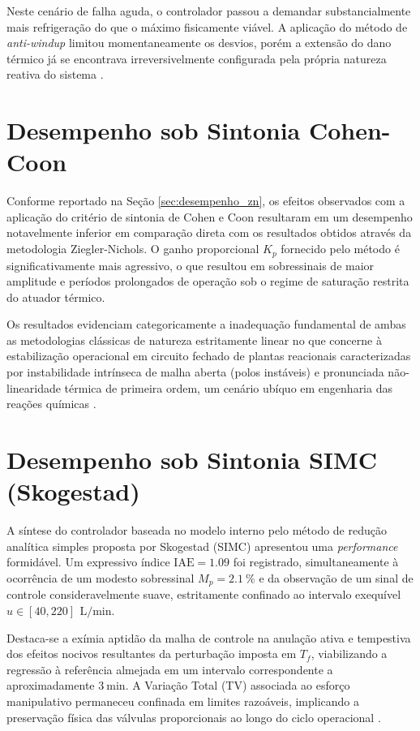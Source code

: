 Neste cenário de falha aguda, o controlador passou a demandar substancialmente mais refrigeração do que o máximo fisicamente viável. A aplicação do método de \textit{anti-windup} limitou momentaneamente os desvios, porém a extensão do dano térmico já se encontrava irreversivelmente configurada pela própria natureza reativa do sistema \cite{Bequette2003}.

\section{Desempenho sob Sintonia Cohen-Coon}
\label{sec:desempenho_cc}

Conforme reportado na Seção \ref{sec:desempenho_zn}, os efeitos observados com a aplicação do critério de sintonia de Cohen e Coon \cite{CohenCoon1953} resultaram em um desempenho notavelmente inferior em comparação direta com os resultados obtidos através da metodologia Ziegler-Nichols. O ganho proporcional $K_p$ fornecido pelo método é significativamente mais agressivo, o que resultou em sobressinais de maior amplitude e períodos prolongados de operação sob o regime de saturação restrita do atuador térmico.

Os resultados evidenciam categoricamente a inadequação fundamental de ambas as metodologias clássicas de natureza estritamente linear no que concerne à estabilização operacional em circuito fechado de plantas reacionais caracterizadas por instabilidade intrínseca de malha aberta (polos instáveis) e pronunciada não-linearidade térmica de primeira ordem, um cenário ubíquo em engenharia das reações químicas \cite{Luyben2007}.

\section{Desempenho sob Sintonia SIMC (Skogestad)}
\label{sec:desempenho_simc}

A síntese do controlador baseada no modelo interno pelo método de redução analítica simples proposta por Skogestad (SIMC) \cite{Skogestad2003} apresentou uma \textit{performance} formidável. Um expressivo índice $\text{IAE} = 1.09$ foi registrado, simultaneamente à ocorrência de um modesto sobressinal $M_p = \SI{2.1}{\percent}$ e da observação de um sinal de controle consideravelmente suave, estritamente confinado ao intervalo exequível $u \in [40, 220]\,\SI{}{\liter\per\minute}$.

Destaca-se a exímia aptidão da malha de controle na anulação ativa e tempestiva dos efeitos nocivos resultantes da perturbação imposta em $T_f$, viabilizando a regressão à referência almejada em um intervalo correspondente a aproximadamente $\SI{3}{\minute}$. A Variação Total (TV) associada ao esforço manipulativo permaneceu confinada em limites razoáveis, implicando a preservação física das válvulas proporcionais ao longo do ciclo operacional \cite{Seborg2016}.

